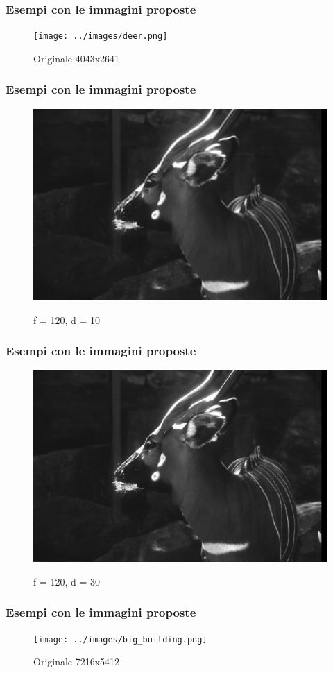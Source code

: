 \documentclass{beamer}
\begin{document}
\begin{frame}
	\frametitle{Esempi con le immagini proposte}
	\begin{figure}
		{\texttt{[image: ../images/deer.png]}}
		\caption{Originale 4043x2641}
	\end{figure}	
\end{frame}

\begin{frame}
	\frametitle{Esempi con le immagini proposte}
	\begin{figure}
		{\includegraphics[width=.8\linewidth]{../images/deer-compressed-120-10.png}}
		\caption{f = 120, d = 10}
	\end{figure}	
\end{frame}

\begin{frame}
	\frametitle{Esempi con le immagini proposte}
	\begin{figure}
		{\includegraphics[width=.8\linewidth]{../images/deer-compressed-120-30.png}}
		\caption{f = 120, d = 30}
	\end{figure}	
\end{frame}

\begin{frame}
	\frametitle{Esempi con le immagini proposte}
	\begin{figure}
		{\texttt{[image: ../images/big\_building.png]}}
		\caption{Originale 7216x5412}
	\end{figure}	
\end{frame}
\end{document}
